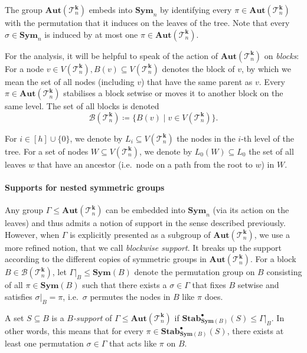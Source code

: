 \documentclass[11pt]{article}
\newcommand{\Aut}{\mathbf{Aut}}
\newcommand{\Sym}{\mathbf{Sym}}
\newcommand{\StabP}{\mathbf{Stab}^{\bullet}}
\newcommand{\Bb}{{\mathcal B}}
\newcommand{\Tt}{{\mathcal T}}
\theoremstyle{definition}
\theoremstyle{plain}
\theoremstyle{remark}
\theoremstyle{remark}
\begin{document}
The group $\Aut(\Tt_n^{\boldsymbol{k}})$ embeds into $\Sym_n$ by identifying every $\pi \in \Aut(\Tt_n^{\boldsymbol{k}})$ with the permutation that it induces on the leaves of the tree. Note that every $\sigma \in \Sym_n$ is induced by at most one $\pi \in \Aut(\Tt_n^{\boldsymbol{k}})$. 

For the analysis, it will be helpful to speak of the action of $\Aut(\Tt_n^{\boldsymbol{k}})$ on \emph{blocks}: For a node $v \in V(\Tt_n^{\boldsymbol{k}}), B(v) \subseteq V(\Tt_n^{\boldsymbol{k}})$ denotes the block of $v$, by which we mean the set of all nodes (including $v$) that have the same parent as $v$. Every $\pi \in \Aut(\Tt_n^{\boldsymbol{k}})$ stabilises a block setwise or moves it to another block on the same level. The set of all blocks is denoted
\[
\Bb(\Tt_n^{\boldsymbol{k}}) \coloneqq \{ B(v) \mid v \in V(\Tt_n^{\boldsymbol{k}})  \}.
\]

For $i \in [h] \cup \{0\}$, we denote by $L_i \subseteq V(\Tt^{\boldsymbol{k}}_n)$ the nodes in the $i$-th level of the tree. For a set of nodes $W \subseteq V(\Tt^{\boldsymbol{k}}_n)$, we denote by $L_0(W) \subseteq L_0$ the set of all leaves $w$ that have an ancestor (i.e.\ node on a path from the root to $w$) in $W$.


\paragraph*{Supports for nested symmetric groups}
Any group $\Gamma \leq \Aut(\Tt^{\boldsymbol{k}}_n)$ can be embedded into $\Sym_n$ (via its action on the leaves) and thus admits a notion of support in the sense described previously. 
However, when $\Gamma$ is explicitly presented as a subgroup of $\Aut(\Tt^{\boldsymbol{k}}_n)$, we use a more refined notion, that we call \emph{blockwise support}. It breaks up the support according to the different copies of symmetric groups in $\Aut(\Tt^{\boldsymbol{k}}_n)$. 
For a block $B \in \Bb(\Tt_n^{\boldsymbol{k}})$, let $\Gamma|_B \leq \Sym(B)$ denote the permutation group on $B$ consisting of all $\pi \in \Sym(B)$ such that there exists a $\sigma \in \Gamma$ that fixes $B$ setwise and satisfies $\sigma|_B = \pi$, i.e.\ $\sigma$ permutes the nodes in $B$ like $\pi$ does. 

A set $S \subseteq B$ is a \emph{$B$-support} of $\Gamma \leq \Aut(\Tt_n^{\boldsymbol{k}})$ if $\StabP_{\Sym(B)}(S) \leq \Gamma|_B$. In other words, this means that for every $\pi \in \StabP_{\Sym(B)}(S)$, there exists at least one permutation $\sigma \in \Gamma$ that acts like $\pi$ on $B$.
\end{document}

